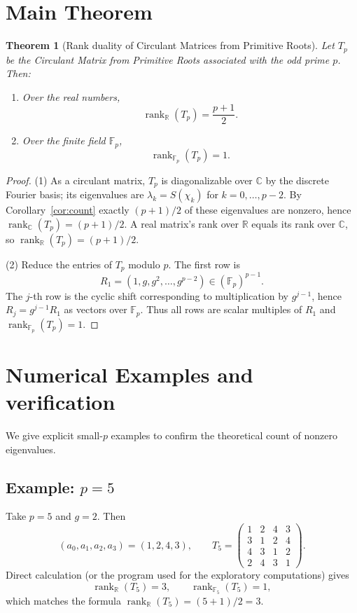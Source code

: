 \documentclass[11pt,a4paper]{article}
\theoremstyle{plain}
\newtheorem{theorem}{Theorem}
\theoremstyle{definition}
\begin{document}
\section{Main Theorem}\label{sec:main}
\begin{theorem}[Rank duality of Circulant Matrices from Primitive Roots]
Let $T_p$ be the Circulant Matrix from Primitive Roots associated with the odd prime $p$. Then:
\begin{enumerate}
    \item Over the real numbers,
    \[
    \operatorname{rank}_{\mathbb{R}}(T_p)=\frac{p+1}{2}.
    \]
    \item Over the finite field $\mathbb{F}_p$,
    \[
    \operatorname{rank}_{\mathbb{F}_p}(T_p)=1.
    \]
\end{enumerate}
\end{theorem}

\begin{proof}
(1) As a circulant matrix, $T_p$ is diagonalizable over $\mathbb{C}$ by the discrete Fourier basis; its eigenvalues are $\lambda_k=S(\chi_k)$ for $k=0,\dots,p-2$. By Corollary~\ref{cor:count} exactly $(p+1)/2$ of these eigenvalues are nonzero, hence $\operatorname{rank}_{\mathbb{C}}(T_p)=(p+1)/2$. A real matrix's rank over $\mathbb{R}$ equals its rank over $\mathbb{C}$, so $\operatorname{rank}_{\mathbb{R}}(T_p)=(p+1)/2$.

(2) Reduce the entries of $T_p$ modulo $p$. The first row is
\[
R_1=(1,g,g^2,\dots,g^{p-2}) \in (\mathbb{F}_p)^{p-1}.
\]
The $j$-th row is the cyclic shift corresponding to multiplication by $g^{j-1}$, hence $R_j=g^{j-1}R_1$ as vectors over $\mathbb{F}_p$. Thus all rows are scalar multiples of $R_1$ and $\operatorname{rank}_{\mathbb{F}_p}(T_p)=1$.
\end{proof}

\section{Numerical Examples and verification}\label{sec:num}
We give explicit small-$p$ examples to confirm the theoretical count of nonzero eigenvalues.

\subsection*{Example: $p=5$}
Take $p=5$ and $g=2$. Then
\[
(a_0,a_1,a_2,a_3)=(1,2,4,3),
\qquad
T_5=\begin{pmatrix}
1 & 2 & 4 & 3\\
3 & 1 & 2 & 4\\
4 & 3 & 1 & 2\\
2 & 4 & 3 & 1
\end{pmatrix}.
\]
Direct calculation (or the program used for the exploratory computations) gives
\[
\operatorname{rank}_{\mathbb{R}}(T_5)=3,\qquad \operatorname{rank}_{\mathbb{F}_5}(T_5)=1,
\]
which matches the formula $\operatorname{rank}_{\mathbb{R}}(T_5)=(5+1)/2=3$.
\end{document}

